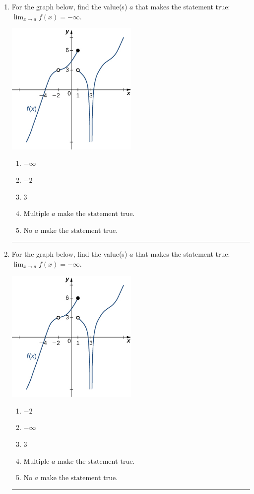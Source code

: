 \documentclass[14pt]{extbook}
\newcommand{\litem}[1]{\item#1\hspace*{-1cm}\rule{\textwidth}{0.4pt}}
\begin{document}
\begin{enumerate}
{\begin{enumerate}[label=\Alph*.]
\end{enumerate} }
\litem{
For the graph below, find the value(s) $a$ that makes the statement true: $ \displaystyle \lim_{x \rightarrow a} f(x) = -\infty$.
\begin{center}
    \includegraphics[width=0.5\textwidth]{../Figures/evaluateLimitGraphicallyCopyB.png}
\end{center}
\begin{enumerate}[label=\Alph*.]
\item \( -\infty \)
\item \( -2 \)
\item \( 3 \)
\item \( \text{Multiple } a \text{ make the statement true}. \)
\item \( \text{No } a \text{ make the statement true}. \)

\end{enumerate} }
\litem{
For the graph below, find the value(s) $a$ that makes the statement true: $ \displaystyle \lim_{x \rightarrow a} f(x) = -\infty$.
\begin{center}
    \includegraphics[width=0.5\textwidth]{../Figures/evaluateLimitGraphicallyB.png}
\end{center}
\begin{enumerate}[label=\Alph*.]
\item \( -2 \)
\item \( -\infty \)
\item \( 3 \)
\item \( \text{Multiple } a \text{ make the statement true}. \)
\item \( \text{No } a \text{ make the statement true}. \)


\end{enumerate}}
\end{enumerate}
\end{document}
